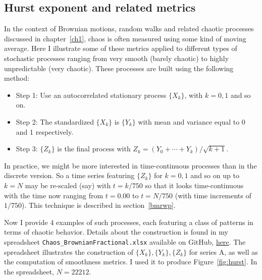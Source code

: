 \documentclass[oneside,10pt]{book}
\begin{document}
\subsection{Hurst exponent and related metrics}

In the context of \textcolor{index}{Brownian motions},
 \textcolor{index}{random walks} and related chaotic processes discussed in chapter~\ref{ch1}, chaos is
 often measured using some kind of moving average. Here I illustrate some of these metrics applied to different types of stochastic processes
 ranging from very smooth (barely chaotic) to highly unpredictable (very chaotic). These processes are built using the following method:
\vspace{1ex}
\begin{itemize}
\item[]Step 1: Use an autocorrelated \textcolor{index}{stationary process} $\{X_k\}$, with $k=0,1$ and so on.
\item[]Step 2: The standardized $\{X_k\}$ is $\{Y_k\}$ with mean and variance equal to 0 and 1 respectively.
\item[]Step 3: $\{Z_k\}$ is the final process with $Z_k = (Y_0 + \cdots + Y_{k})/\sqrt{k+1}$.
\end{itemize}\vspace{1ex}
In practice, we might be more interested in time-continuous processes than in the discrete version. So a time series featuring $\{Z_k\}$
for $k=0,1$ and so on up to $k=N$ may be re-scaled (say) with $t=k/750$ so that it looks time-continuous with the time now ranging from $t=0.00$ to $t=N/750$ (with time increments of $1/750$). This technique is described in section~\ref{bmrwp}.

Now I provide 4 examples of such processes, each featuring a class of patterns in terms of chaotic behavior. Details about the construction is found in
 my spreadsheet \texttt{Chaos\_BrownianFractional.xlsx} available on GitHub, \href{https://github.com/VincentGranville/Stochastic-Processes/blob/master/chaos_BrownianFractional.xlsx}{here}. The spreadsheet illustrates the construction
 of $\{X_k\}, \{Y_k\}, \{Z_k\}$ for series A, as well as the computation of smoothness metrics.
 I used it to produce Figure~\ref{fig:hurst}. In the spreadsheet, $N = \num{22212}$.\vspace{1ex}
\end{document}
